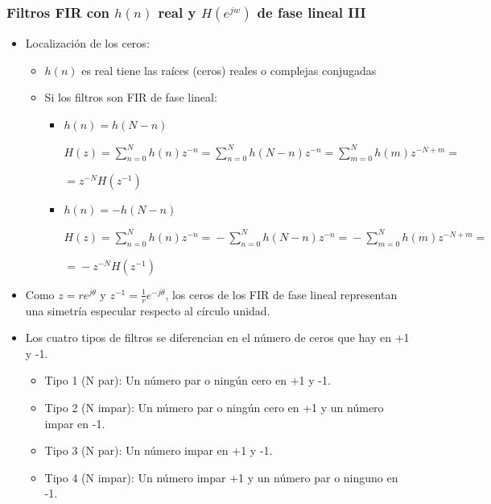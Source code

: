 \begin{frame}
\frametitle{Filtros FIR con $h(n)$ real y $H(e^{jw})$ de fase lineal III}
\footnotesize
\begin{itemize}
\item Localización de los ceros:
\begin{itemize}
\footnotesize
\item $h(n)$ es real tiene las raíces (ceros) reales o complejas conjugadas

\vspace{0.1cm}

\item Si los filtros son FIR de fase lineal:

\begin{itemize}
\footnotesize
\item $h(n)=h(N-n)$

\vspace{0.1cm}

$H(z)\!=\!\sum_{n=0}^N h(n)z^{-n}\!=\!\sum_{n=0}^N h(N\!-\!n)z^{-n}\!=\!\sum_{m=0}^N h(m)z^{-N\!+\!m}\!=$

\vspace{0.1cm}

\hspace{0.7cm}$=\!z^{-N}H(z^{-1})$


\vspace{0.1cm}

\item $h(n)=-h(N-n)$

\vspace{0.1cm}

$H(z)\!=\!\sum_{n=0}^N \!h(n)z^{-n}\!=\!\!-\!\sum_{n=0}^N \!h(N\!-\!n)z^{-n}\!=\!\!-\!\sum_{m=0}^N \!h(m)z^{-N\!+\!m}\!=$

\vspace{0.1cm}

\hspace{0.7cm}$=\!-z^{-N}H(z^{-1})$

\end{itemize}
\end{itemize}
\item Como $z=re^{j\theta}$ y $z^{-1}=\frac{1}{r}e^{-j\theta}$, los ceros de los FIR de fase lineal representan una simetría especular respecto al círculo unidad.

\item Los cuatro tipos de filtros se diferencian en el número de ceros que hay en +1 y -1.
\begin{itemize}
\scriptsize
\item \alert{Tipo 1 (N par): Un número par o ningún cero en +1 y -1.}
\item \alert{Tipo 2 (N impar): Un número par o ningún cero en +1 y un número impar en -1.}
\item \alert{Tipo 3 (N par): Un número impar en +1 y -1.}
\item \alert{Tipo 4 (N impar): Un número impar +1 y un número par o ninguno en -1.}

\end{itemize}


\end{itemize}

\end{frame}

